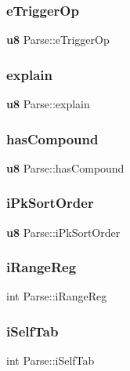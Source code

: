 \subsubsection{eTriggerOp}
{\footnotesize\ttfamily \textbf{ u8} Parse\+::e\+Trigger\+Op}

\mbox{\label{struct_parse_a41f7ea55f0d6523295a5d958e25a2787}} 
\subsubsection{explain}
{\footnotesize\ttfamily \textbf{ u8} Parse\+::explain}

\mbox{\label{struct_parse_a53c500179a70ea59816dea3f6fa04b96}} 
\subsubsection{hasCompound}
{\footnotesize\ttfamily \textbf{ u8} Parse\+::has\+Compound}

\mbox{\label{struct_parse_a2be71f432ab79d2db44f1fcbbce55488}} 
\subsubsection{iPkSortOrder}
{\footnotesize\ttfamily \textbf{ u8} Parse\+::i\+Pk\+Sort\+Order}

\mbox{\label{struct_parse_a715f56a596d5172926c20dd7f91600b6}} 
\subsubsection{iRangeReg}
{\footnotesize\ttfamily int Parse\+::i\+Range\+Reg}

\mbox{\label{struct_parse_a5858bb3d9d291446cb5c435aa0ce9dbc}} 
\subsubsection{iSelfTab}
{\footnotesize\ttfamily int Parse\+::i\+Self\+Tab}

\mbox{\label{struct_parse_a027d06007eab8e01b8930357f321344b}} 
